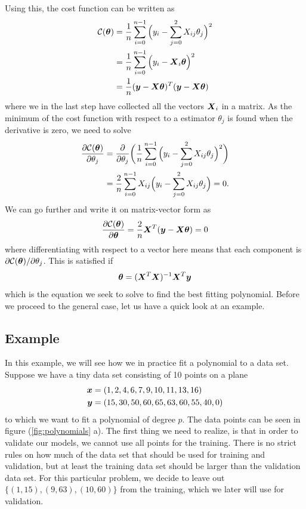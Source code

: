 Using this, the cost function can be written as
\begin{align}
\mathcal{C}(\boldsymbol{{\theta}})&=\frac{1}{n}\sum_{i=0}^{n-1}\Big(y_i-\sum_{j=0}^2X_{ij}\theta_j\Big)^2\notag\\
&=\frac{1}{n}\sum_{i=0}^{n-1}\Big(y_i-\boldsymbol{{X}}_i\boldsymbol{{\theta}}\Big)^2\label{eq:costols}\\
&=\frac{1}{n}(\boldsymbol{{y}}-\boldsymbol{{X}}\boldsymbol{{\theta}})^T(\boldsymbol{{y}}-\boldsymbol{{X}}\boldsymbol{{\theta}})\notag
\end{align}
where we in the last step have collected all the vectors $\boldsymbol{{X}}_i$ in a matrix. As the minimum of the cost function with respect to a estimator $\theta_j$ is found when the derivative is zero, we need to solve
\begin{align*}
\frac{\partial \mathcal{C}(\boldsymbol{{\theta}})}{\partial\theta_j} &=\frac{\partial}{\partial\theta_j}\bigg(\frac{1}{n}\sum_{i=0}^{n-1}\Big(y_i-\sum_{j=0}^2X_{ij}\theta_j\Big)^2\bigg)\notag\label{eq:gh}\\
&=\frac{2}{n}\sum_{i=0}^{n-1}X_{ij}\Big(y_i-\sum_{j=0}^2X_{ij}\theta_j\Big)=0.
\end{align*}
We can go further and write it on matrix-vector form as
\begin{equation*}
\frac{\partial \mathcal{C}(\boldsymbol{{\theta}})}{\partial\boldsymbol{{\theta}}}=\frac{2}{n}\boldsymbol{{X}}^T(\boldsymbol{{y}}-\boldsymbol{{X}}\boldsymbol{{\theta}})=0
\end{equation*}
where differentiating with respect to a vector here means that each component is $\partial\mathcal{C(\boldsymbol{{\theta}})}/\partial\theta_j$. This is satisfied if
\begin{equation}
\boldsymbol{{\theta}}=(\boldsymbol{{X}}^T\boldsymbol{{X}})^{-1}\boldsymbol{{X}}^T\boldsymbol{{y}}
\label{eq:polynomialestimators}
\end{equation}
which is the equation we seek to solve to find the best fitting polynomial. Before we proceed to the general case, let us have a quick look at an example.

\subsection{Example} \label{sec:example}
In this example, we will see how we in practice fit a polynomial to a data set. Suppose we have a tiny data set consisting of 10 points on a plane
\begin{align}
\boldsymbol{{x}}&=(1,2,4,6,7,9,10,11,13,16)\notag\\
\boldsymbol{{y}}&=(15,30,50,60,65,63,60,55,40,0)
\label{eq:datapoints}
\end{align}
to which we want to fit a polynomial of degree $p$. The data points can be seen in figure (\ref{fig:polynomials} a). The first thing we need to realize, is that in order to validate our models, we cannot use all points for the training. There is no strict rules on how much of the data set that should be used for training and validation, but at least the training data set should be larger than the validation data set. For this particular problem, we decide to leave out $\{(1,15),(9,63),(10,60)\}$ from the training, which we later will use for validation.

